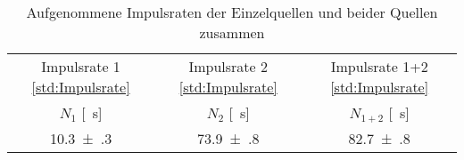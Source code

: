 \begin{table}[!h]
	\centering
	\begin{tabular}{|c|c|c|}
		\hline
		Impulsrate 1 \cref{std:Impulsrate} & Impulsrate 2 \cref{std:Impulsrate} & Impulsrate 1+2 \cref{std:Impulsrate}\\
		$N_1$ [\si{\per\second}] & $N_2$ [\si{\per\second}] & $N_{1+2}$ [\si{\per\second}]\\
\hline\hline
		\num{10.3(3)} & \num{73.9(8)} & \num{82.7(8)}\\
		\hline
	\end{tabular}
	\caption{Aufgenommene Impulsraten der Einzelquellen und beider Quellen zusammen \label{tab:Auswertung_Totzeit}}
\end{table}
